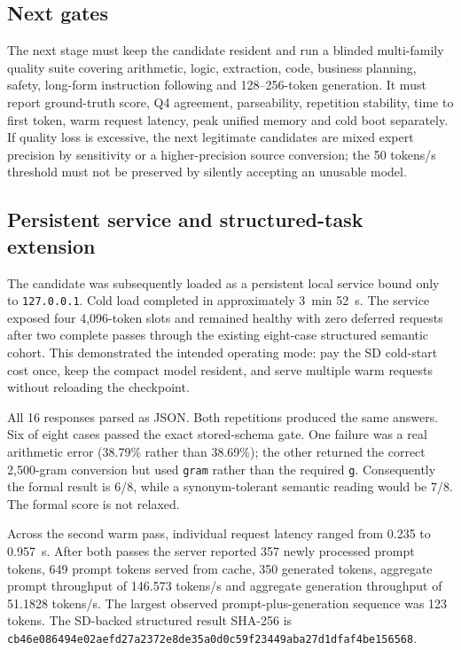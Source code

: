 \subsection{Next gates}

The next stage must keep the candidate resident and run a blinded multi-family
quality suite covering arithmetic, logic, extraction, code, business planning,
safety, long-form instruction following and 128--256-token generation.  It must
report ground-truth score, Q4 agreement, parseability, repetition stability,
time to first token, warm request latency, peak unified memory and cold boot
separately.  If quality loss is excessive, the next legitimate candidates are
mixed expert precision by sensitivity or a higher-precision source conversion;
the 50 tokens/s threshold must not be preserved by silently accepting an
unusable model.

\subsection{Persistent service and structured-task extension}

The candidate was subsequently loaded as a persistent local service bound only
to \texttt{127.0.0.1}.  Cold load completed in approximately 3~min 52~s.  The
service exposed four 4{,}096-token slots and remained healthy with zero deferred
requests after two complete passes through the existing eight-case structured
semantic cohort.  This demonstrated the intended operating mode: pay the SD
cold-start cost once, keep the compact model resident, and serve multiple warm
requests without reloading the checkpoint.

All 16 responses parsed as JSON.  Both repetitions produced the same answers.
Six of eight cases passed the exact stored-schema gate.  One failure was a real
arithmetic error (38.79\% rather than 38.69\%); the other returned the correct
2{,}500-gram conversion but used \texttt{gram} rather than the required
\texttt{g}.  Consequently the formal result is 6/8, while a synonym-tolerant
semantic reading would be 7/8.  The formal score is not relaxed.

Across the second warm pass, individual request latency ranged from 0.235 to
0.957~s.  After both passes the server reported 357 newly processed prompt
tokens, 649 prompt tokens served from cache, 350 generated tokens, aggregate
prompt throughput of 146.573 tokens/s and aggregate generation throughput of
51.1828 tokens/s.  The largest observed prompt-plus-generation sequence was 123
tokens.  The SD-backed structured result SHA-256 is
\texttt{cb46e086494e02aefd27a2372e8de35a0d0c59f23449aba27d1dfaf4be156568}.

